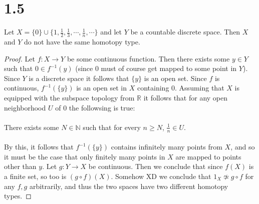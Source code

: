 \documentclass{article}
\theoremstyle{definition}
\begin{document}
\section*{1.5}
    \begin{mdframed}[]
        Let $X = \{0\} \cup \{1, \frac{1}{2}, \frac{1}{3}, \cdots, \frac{1}{n}, \cdots \}$ and let $Y$ be a
        countable discrete space. Then $X$ and $Y$ do not have the same homotopy type.
    \end{mdframed}
    \begin{proof}
        Let $f: X \rightarrow Y$ be some continuous function. Then there exists some $y \in Y$ such that 
        $0 \in f^{-1}(y)$ (since $0$ must of course get mapped to some point in $Y$). Since $Y$ is a discrete 
        space it follows that $\{y\}$ is an open set. Since $f$ is continuous, $f^{-1}(\{y\})$ is an open set in 
        $X$ containing 0. Assuming that $X$ is equipped with the subspace topology from $\mathbb{R}$ it follows that 
        for any open neighborhood $U$ of 0 the followsing is true:\\\\
        There exists some $N \in \mathbb{N}$ such that for every $n \geq N$, $\frac{1}{n} \in U$.\\\\
        By this, it follows that $f^{-1}(\{y\})$ contains infinitely many points from $X$, and so it must be 
        the case that only finitely many points in $X$ are mapped to points other than $y$. Let $g:Y\rightarrow X$
        be continuous. Then we conclude that since $f(X)$ is a finite set, so too is $(g \circ f)(X)$.
        Somehow XD we conclude that $1_X \not\simeq g \circ f$ for any $f,g$ arbitrarily, and thus the two 
        spaces have two different homotopy types.
    \end{proof}
\end{document}
